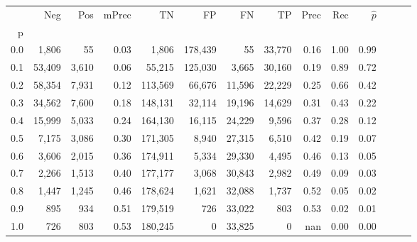 \begin{tabular}{rrrrrrrrrrrrrr}
\toprule
{} &     Neg &    Pos & mPrec &       TN &       FP &      FN &      TP &  Prec &   Rec & $\hat{p}$ \\
p   &         &        &       &          &          &         &         &       &       &           \\
\midrule
0.0 &   1,806 &     55 &  0.03 &    1,806 &  178,439 &      55 &  33,770 &  0.16 &  1.00 &      0.99 \\
0.1 &  53,409 &  3,610 &  0.06 &   55,215 &  125,030 &   3,665 &  30,160 &  0.19 &  0.89 &      0.72 \\
0.2 &  58,354 &  7,931 &  0.12 &  113,569 &   66,676 &  11,596 &  22,229 &  0.25 &  0.66 &      0.42 \\
0.3 &  34,562 &  7,600 &  0.18 &  148,131 &   32,114 &  19,196 &  14,629 &  0.31 &  0.43 &      0.22 \\
0.4 &  15,999 &  5,033 &  0.24 &  164,130 &   16,115 &  24,229 &   9,596 &  0.37 &  0.28 &      0.12 \\
0.5 &   7,175 &  3,086 &  0.30 &  171,305 &    8,940 &  27,315 &   6,510 &  0.42 &  0.19 &      0.07 \\
0.6 &   3,606 &  2,015 &  0.36 &  174,911 &    5,334 &  29,330 &   4,495 &  0.46 &  0.13 &      0.05 \\
0.7 &   2,266 &  1,513 &  0.40 &  177,177 &    3,068 &  30,843 &   2,982 &  0.49 &  0.09 &      0.03 \\
0.8 &   1,447 &  1,245 &  0.46 &  178,624 &    1,621 &  32,088 &   1,737 &  0.52 &  0.05 &      0.02 \\
0.9 &     895 &    934 &  0.51 &  179,519 &      726 &  33,022 &     803 &  0.53 &  0.02 &      0.01 \\
1.0 &     726 &    803 &  0.53 &  180,245 &        0 &  33,825 &       0 &   nan &  0.00 &      0.00 \\
\bottomrule
\end{tabular}
